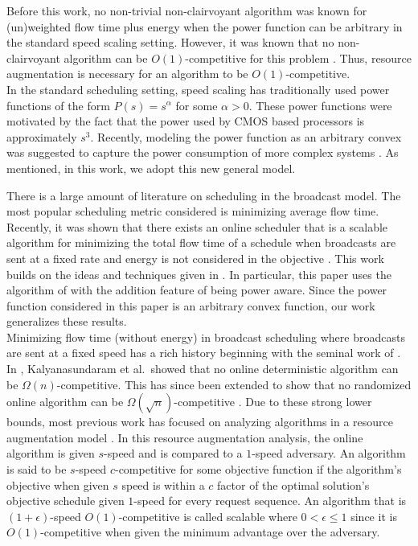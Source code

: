 \documentclass[11pt]{article}
\newcommand{\etal}{et al.\ }
\newcommand{\eps}{\epsilon}
\begin{document}
Before this work, no non-trivial non-clairvoyant algorithm was known for (un)weighted flow time plus energy when the power function can be arbitrary in the standard speed scaling setting. However, it was known that no non-clairvoyant algorithm can be $O(1)$-competitive for this problem \cite{ChanELLMP09}.  Thus, resource augmentation is necessary for an algorithm to be $O(1)$-competitive. \\
 


 In the standard scheduling setting, speed scaling has traditionally used power functions of the form $P(s) = s^\alpha$ for some $\alpha >0$.  These power functions were motivated by the fact that  the power used by CMOS based processors is approximately $s^3$. Recently, modeling the power function as an arbitrary convex was suggested to capture the power consumption of more complex systems \cite{BansalKN09}. As mentioned, in this work, we adopt this new general model.

 There is a large amount of literature on scheduling in the broadcast model.  The most popular scheduling metric considered is minimizing average flow time. Recently, it was shown that there exists an online scheduler that is a scalable algorithm for minimizing the total flow time of a schedule when broadcasts are sent at a fixed rate and energy is not considered in the objective \cite{ImM10, BansalKN09}. This work builds on the ideas and techniques given in \cite{BansalKN09}.  In particular, this paper uses the algorithm of \cite{BansalKN09} with the addition feature of being power aware.  Since the power function considered in this paper is an arbitrary convex function, our work generalizes these results.  \\



  Minimizing flow time (without energy) in broadcast scheduling where broadcasts are sent at a fixed speed has a rich history beginning with the seminal work of \cite{KalyanasundaramPV00,BartalM00}.  In \cite{KalyanasundaramPV00},  Kalyanasundaram \etal showed that no online deterministic algorithm can be $\Omega(n)$-competitive.  This has since been extended to show that no randomized online algorithm can be $\Omega(\sqrt{n})$-competitive \cite{BansalCKN05}.  Due to these strong lower bounds, most previous work has focused on analyzing algorithms in a resource augmentation model \cite{KalyanasundaramP95}.  In this resource augmentation analysis, the online algorithm is given $s$-speed and is compared to a $1$-speed adversary.  An algorithm is said to be $s$-speed $c$-competitive for some objective function if the algorithm's objective when given $s$ speed is within a $c$ factor of the optimal solution's objective schedule given $1$-speed for every request sequence.    An algorithm that is $(1+\eps)$-speed $O(1)$-competitive is called scalable where $0 < \eps \leq 1$ since it is $O(1)$-competitive when given the minimum advantage over the adversary.  
\end{document}
